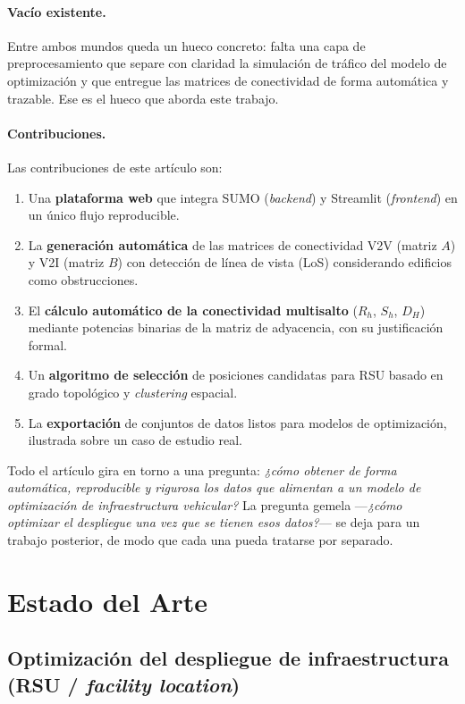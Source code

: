 \documentclass[smartcities,article,submit,oneauthor]{Definitions/mdpi}
\begin{document}
\paragraph{Vacío existente.} Entre ambos mundos queda un hueco concreto: falta una
capa de preprocesamiento que separe con claridad la simulación de tráfico del modelo
de optimización y que entregue las matrices de conectividad de forma automática y
trazable. Ese es el hueco que aborda este trabajo.

\paragraph{Contribuciones.} Las contribuciones de este artículo son:
\begin{enumerate}
\item Una \textbf{plataforma web} que integra SUMO (\emph{backend}) y Streamlit
(\emph{frontend}) en un único flujo reproducible.
\item La \textbf{generación automática} de las matrices de conectividad V2V
(matriz $A$) y V2I (matriz $B$) con detección de línea de vista (LoS) considerando
edificios como obstrucciones.
\item El \textbf{cálculo automático de la conectividad multisalto} ($R_h$, $S_h$,
$D_H$) mediante potencias binarias de la matriz de adyacencia, con su justificación
formal.
\item Un \textbf{algoritmo de selección} de posiciones candidatas para RSU basado
en grado topológico y \emph{clustering} espacial.
\item La \textbf{exportación} de conjuntos de datos listos para modelos de
optimización, ilustrada sobre un caso de estudio real.
\end{enumerate}

Todo el artículo gira en torno a una pregunta: \emph{¿cómo obtener de forma
automática, reproducible y rigurosa los datos que alimentan a un modelo de
optimización de infraestructura vehicular?} La pregunta gemela ---\emph{¿cómo
optimizar el despliegue una vez que se tienen esos datos?}--- se deja para un
trabajo posterior, de modo que cada una pueda tratarse por separado.

\section{Estado del Arte}

\subsection{Optimización del despliegue de infraestructura (RSU / \emph{facility location})}
\end{document}
